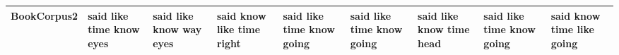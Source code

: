 \documentclass[11pt,a4paper]{article}
\begin{document}
\begin{appendices}
\begin{table*}[htp]
\begin{tiny}
\begin{tabular}{|p{}|p{}|p{}|p{}|p{}|p{}|p{}|p{}|p{}|}
BookCorpus2 & said \newline like \newline time \newline know \newline eyes & said \newline like \newline know \newline way \newline eyes & said \newline know \newline like \newline time \newline right & said \newline like \newline time \newline know \newline going & said \newline like \newline time \newline know \newline going & said \newline like \newline know \newline time \newline head & said \newline like \newline time \newline know \newline going & said \newline know \newline time \newline like \newline going\\\hline

\end{tabular}
\end{tiny}
\end{table*}
\end{appendices}
\end{document}
